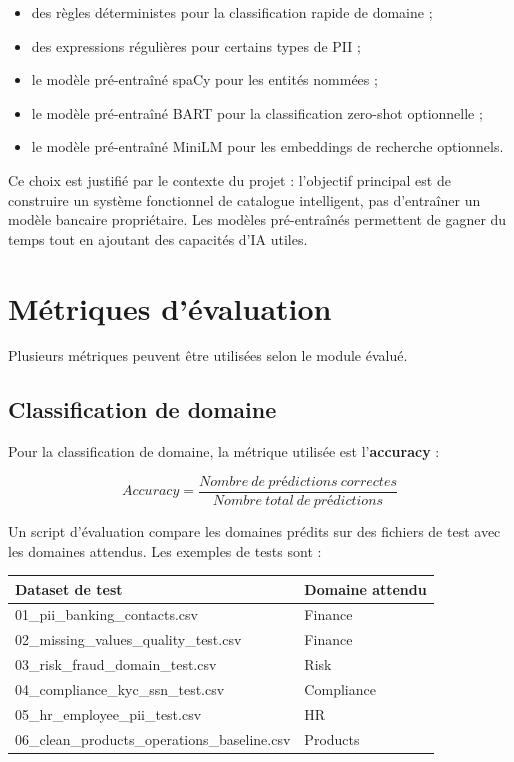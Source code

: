 \documentclass[12pt,a4paper]{report}
\begin{document}
\begin{itemize}
    \item des règles déterministes pour la classification rapide de domaine ;
    \item des expressions régulières pour certains types de PII ;
    \item le modèle pré-entraîné spaCy pour les entités nommées ;
    \item le modèle pré-entraîné BART pour la classification zero-shot optionnelle ;
    \item le modèle pré-entraîné MiniLM pour les embeddings de recherche optionnels.
\end{itemize}

Ce choix est justifié par le contexte du projet : l'objectif principal est de construire un système fonctionnel de catalogue intelligent, pas d'entraîner un modèle bancaire propriétaire. Les modèles pré-entraînés permettent de gagner du temps tout en ajoutant des capacités d'IA utiles.

\section{Métriques d'évaluation}

Plusieurs métriques peuvent être utilisées selon le module évalué.

\subsection{Classification de domaine}

Pour la classification de domaine, la métrique utilisée est l'\textbf{accuracy} :

\[
Accuracy = \frac{Nombre\ de\ prédictions\ correctes}{Nombre\ total\ de\ prédictions}
\]

Un script d'évaluation compare les domaines prédits sur des fichiers de test avec les domaines attendus. Les exemples de tests sont :

\begin{longtable}{p{7cm}p{4cm}}
\toprule
\textbf{Dataset de test} & \textbf{Domaine attendu} \\
\midrule
01\_pii\_banking\_contacts.csv & Finance \\
02\_missing\_values\_quality\_test.csv & Finance \\
03\_risk\_fraud\_domain\_test.csv & Risk \\
04\_compliance\_kyc\_ssn\_test.csv & Compliance \\
05\_hr\_employee\_pii\_test.csv & HR \\
06\_clean\_products\_operations\_baseline.csv & Products \\
\bottomrule
\end{longtable}
\end{document}
